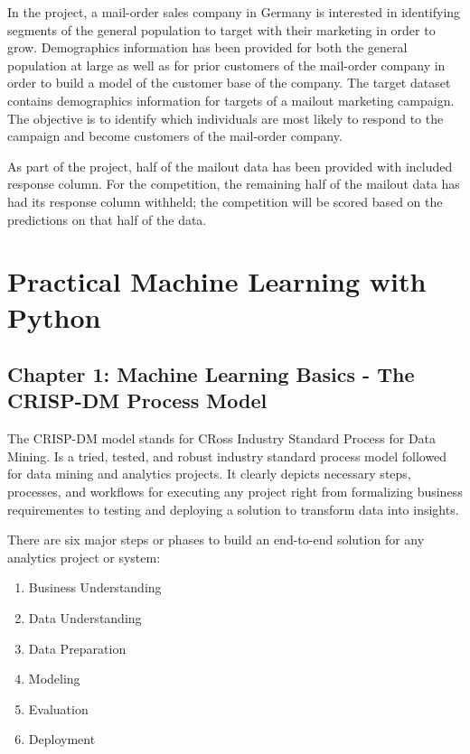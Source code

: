 In the project, a mail-order sales company in Germany is interested in
identifying segments of the general population to target with their
marketing in order to grow. Demographics information has been provided
for both the general population at large as well as for prior customers
of the mail-order company in order to build a model of the customer base
of the company. The target dataset contains demographics information for
targets of a mailout marketing campaign. The objective is to identify
which individuals are most likely to respond to the campaign and become
customers of the mail-order company.

As part of the project, half of the mailout data has been provided with
included response column. For the competition, the remaining half of the
mailout data has had its response column withheld; the competition will
be scored based on the predictions on that half of the data.

\hypertarget{practical-machine-learning-with-python}{%
\section{Practical Machine Learning with
Python}\label{practical-machine-learning-with-python}}

\hypertarget{chapter-1-machine-learning-basics---the-crisp-dm-process-model}{%
\subsection{Chapter 1: Machine Learning Basics - The CRISP-DM Process
Model}\label{chapter-1-machine-learning-basics---the-crisp-dm-process-model}}

The CRISP-DM model stands for CRoss Industry Standard Process for Data
Mining. Is a tried, tested, and robust industry standard process model
followed for data mining and analytics projects. It clearly depicts
necessary steps, processes, and workflows for executing any project
right from formalizing business requirementes to testing and deploying a
solution to transform data into insights.

There are six major steps or phases to build an end-to-end solution for
any analytics project or system:

\begin{enumerate}
\def\labelenumi{\arabic{enumi}.}
\item
  Business Understanding
\item
  Data Understanding
\item
  Data Preparation
\item
  Modeling
\item
  Evaluation
\item
  Deployment
\end{enumerate}

